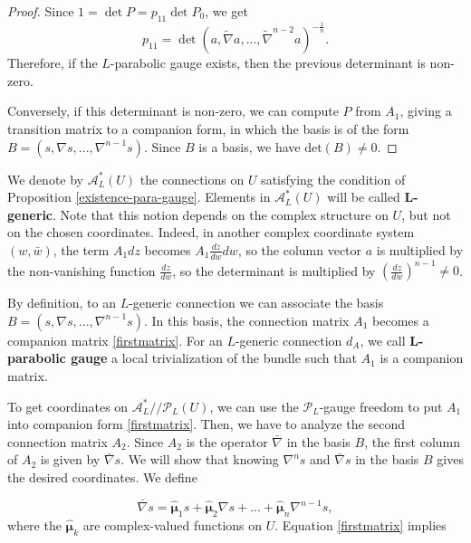 \documentclass[11pt]{amsart}
\numberwithin{thm}{section} %
\numberwithin{equation}{section} %
\numberwithin{figure}{section} %
\begin{document}
\begin{proof}
Since $1=\det P =p_{11}\det P_0$, we get $$p_{11} = \det(a,\widetilde{\nabla}a,...,\widetilde{\nabla}^{n-2}a)^{-\frac{1}{n}}.$$
Therefore, if the $L$-parabolic gauge exists, then the previous determinant is non-zero.

Conversely, if this determinant is non-zero, we can compute $P$ from $A_1$, giving a transition matrix to a companion form, in which the basis is of the form $B=(s,\nabla s, ..., \nabla^{n-1}s)$. Since $B$ is a basis, we have $\mathrm{det}(B)\neq 0$.
\end{proof}

We denote by $\mathcal{A}^*_L(U)$ the connections on $U$ satisfying the condition of Proposition \ref{existence-para-gauge}. Elements in $\mathcal{A}^*_L(U)$ will be called $\mathbf{L}$\textbf{-generic}. Note that this notion depends on the complex structure on $U$, but not on the chosen coordinates. Indeed, in another complex coordinate system $(w,\bar{w})$, the term $A_1dz$ becomes $A_1\tfrac{dz}{dw}dw$, so the column vector $a$ is multiplied by the non-vanishing function $\tfrac{dz}{dw}$, so the determinant is multiplied by $\left(\tfrac{dz}{dw}\right)^{n-1}\neq 0$.

By definition, to an $L$-generic connection we can associate the basis $B=(s,\nabla s,...,\nabla^{n-1}s)$. In this basis, the connection matrix $A_1$ becomes a companion matrix \eqref{firstmatrix}. For an $L$-generic connection $d_A$, 
we call $\mathbf{L}$\textbf{-parabolic gauge} a local trivialization of the bundle such that $A_1$ is a companion matrix.

To get coordinates on $\mathcal{A}^*_L//\mathcal{P}_L(U)$, we can use the $\mathcal{P}_L$-gauge freedom to put $A_1$ into companion form \eqref{firstmatrix}. Then, we have to analyze the second connection matrix $A_2$. Since $A_2$ is the operator $\bar{\nabla}$ in the basis $B$, the first column of $A_2$ is given by $\bar{\nabla}s$. We will show that knowing $\nabla^n s$ and $\bar{\nabla} s$ in the basis $B$ gives the desired coordinates. We define

\begin{equation}\label{eqqq2}
\bar{\nabla}s = \bm\hat{\mu}_1 s + \bm\hat{\mu}_2 \nabla s + ... + \bm\hat{\mu}_n \nabla^{n-1}s,
\end{equation}
where the $\bm\hat{\mu}_k$ are complex-valued functions on $U$. Equation \eqref{firstmatrix} implies

\end{document}
